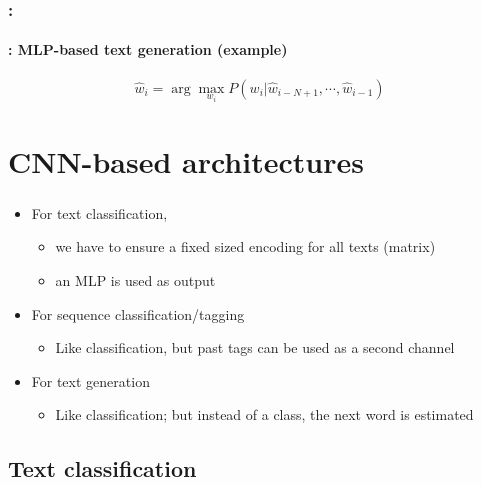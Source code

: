 \documentclass[xcolor=table]{beamer}
\begin{document}
\begin{frame}
	\frametitle{\insertshortsubtitle: \insertsection}
	\framesubtitle{\insertsubsection: MLP-based text generation (example)}
	
	\[\hat{w}_i = \arg\max\limits_{w_i} P(w_i | \hat{w}_{i-N+1}, \cdots, \hat{w}_{i-1})\]
	
	\begin{center}
	\end{center}
	
\end{frame}


\section{CNN-based architectures}

\begin{frame}
	\frametitle{\insertshortsubtitle}
	\framesubtitle{\insertsection}
	
	\begin{itemize}
		\item For text classification, 
		\begin{itemize}
			\item we have to ensure a fixed sized encoding for all texts (matrix)
			\item an MLP is used as output 
		\end{itemize}
		\item For sequence classification/tagging
		\begin{itemize}
			\item Like classification, but past tags can be used as a second channel 
		\end{itemize}
		\item For text generation
		\begin{itemize}
			\item Like classification; but instead of a class, the next word is estimated
		\end{itemize}
	\end{itemize}
	
\end{frame}

\subsection{Text classification}
\end{document}
